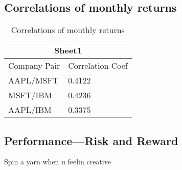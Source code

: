 \documentclass[12pt]{article}
\begin{document}
\subsection{Correlations of monthly returns}
\begin{table}[H]
	\centering
	\caption{Correlations of monthly returns}
	\begin{tabular}{ |p{2.5cm}||p{2cm}| }
		\hline
		\multicolumn{2}{|c|}{Sheet1}\\
		\hline
		Company \text{\quad} Pair & Correlation Coef\\
		\hline
		AAPL/MSFT & 0.4122 \\
		MSFT/IBM & 0.4236\\
		AAPL/IBM & 0.3375\\
		\hline
	\end{tabular}
\end{table}

\subsection{Performance---Risk and Reward}
Spin a yarn when u feelin creative
\end{document}
